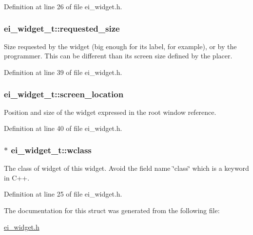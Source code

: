 Definition at line 26 of file ei\-\_\-widget.\-h.

\hypertarget{structei__widget__t_ae82b19958b3ec72a855986dffb9b92ea}{
\subsubsection[{requested\-\_\-size}]{ ei\-\_\-widget\-\_\-t\-::requested\-\_\-size}}\label{structei__widget__t_ae82b19958b3ec72a855986dffb9b92ea}


Size requested by the widget (big enough for its label, for example), or by the programmer. This can be different than its screen size defined by the placer. 



Definition at line 39 of file ei\-\_\-widget.\-h.

\hypertarget{structei__widget__t_ad139e1541329b54e0b4c8d746e14b204}{
\subsubsection[{screen\-\_\-location}]{ ei\-\_\-widget\-\_\-t\-::screen\-\_\-location}}\label{structei__widget__t_ad139e1541329b54e0b4c8d746e14b204}


Position and size of the widget expressed in the root window reference. 



Definition at line 40 of file ei\-\_\-widget.\-h.

\hypertarget{structei__widget__t_a429e970e1d266252df4dbe55296b9f70}{
\subsubsection[{wclass}]{$\ast$ ei\-\_\-widget\-\_\-t\-::wclass}}\label{structei__widget__t_a429e970e1d266252df4dbe55296b9f70}


The class of widget of this widget. Avoid the field name \char`\"{}class\char`\"{} which is a keyword in C++. 



Definition at line 25 of file ei\-\_\-widget.\-h.



The documentation for this struct was generated from the following file\-:\begin{DoxyCompactItemize}
\item 
\hyperlink{ei__widget_8h}{ei\-\_\-widget.\-h}\end{DoxyCompactItemize}
